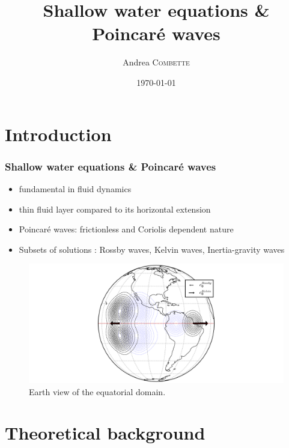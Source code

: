 \documentclass[numbering=fraction]{beamer}
\title{Shallow water equations \& Poincaré waves}\author{Andrea \textsc{Combette}}
\institute{ENS ULM}
\date{\today{}}
\begin{document}
\begin{frame}
    \titlepage
\end{frame}
\section{Introduction}
\begin{frame}
    \frametitle{Shallow water equations \& Poincaré waves}
    \begin{minipage}{0.6\linewidth}
        \begin{itemize}
            \item fundamental in fluid dynamics
            \item thin fluid layer compared to its horizontal extension
            \item Poincaré waves: frictionless and Coriolis dependent nature
            \item Subsets of solutions : Rossby waves, Kelvin waves, Inertia-gravity waves
        \end{itemize}
    \end{minipage}
    \hfill
    \begin{minipage}{0.38\linewidth}
        \begin{figure}[H]
            \hspace*{-3cm}\includegraphics[width=2.5\linewidth]{./figure/earth_view.png}
            \caption{\footnotesize{Earth view of the equatorial domain.}}
            \label{fig:}
        \end{figure}
    \end{minipage}
\end{frame}

\section{Theoretical background}
\end{document}

